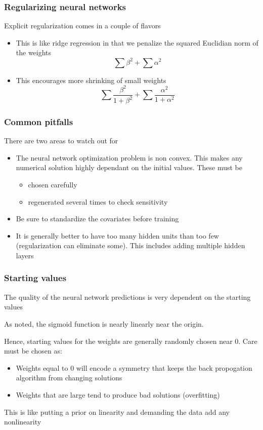 \documentclass[12pt]{beamer}
\begin{document}
\begin{frame}[fragile]
\frametitle{Regularizing neural networks}
Explicit regularization comes in a couple of flavors
\begin{itemize}
\item {} This is like ridge regression in that we penalize the squared
Euclidian norm of the weights
\[
\sum \beta^2 + \sum \alpha^2
\]
\item {} This encourages more shrinking of small weights
\[
\sum \frac{\beta^2}{1+\beta^2} + \sum \frac{\alpha^2}{1 + \alpha^2}
\]
\end{itemize}
\end{frame}

\begin{frame}[fragile]
\frametitle{Common pitfalls}
There are two areas to watch out for
\begin{itemize}
\item {} The neural network optimization problem is non convex.  This makes
any numerical solution highly dependant on the initial values.  These must be 
\begin{itemize}
\item chosen carefully
\item regenerated several times to check sensitivity
\end{itemize}
\item {} Be sure to standardize the covariates before training
\item {} It is generally better to have too many hidden units
than too few (regularization can eliminate some).  This includes adding multiple hidden layers
\end{itemize}
\end{frame}


\begin{frame}[fragile]
\frametitle{Starting values}
The quality of the neural network predictions is very dependent on the starting values

\vsp
As noted, the sigmoid function is nearly linearly near the origin. 

\vsp
Hence, starting values for the weights are generally randomly chosen near 0.  Care must be chosen as:
\begin{itemize}
\item Weights equal to 0 will encode a symmetry that keeps the back propogation algorithm from changing solutions
\item Weights that are large tend to produce bad solutions (overfitting)
\end{itemize}
\vsp
This is like putting a prior on linearity and demanding the data add any nonlinearity
\end{frame}
\end{document}
